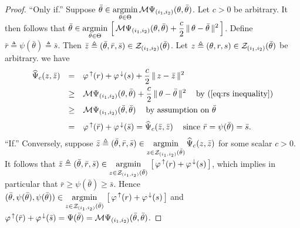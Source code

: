\documentclass{siamart}
\newcommand{\epc}{\hspace{1pc}}
\newcommand{\wh}{\widehat}
\begin{document}
\begin{proof}
 ``Only if.''  Suppose  $\bar{\theta} \in \displaystyle{
\operatornamewithlimits{\mbox{argmin}}_{\theta \in \Theta}
} \, {\cal M}\Psi_{(i_1, i_2)}(\theta,\bar{\theta})$.  Let $c > 0$ be arbitrary.  It then follows that
$\bar{\theta} \in \displaystyle{
\operatornamewithlimits{\mbox{argmin}}_{\theta \in \Theta}
} \, \left[ \, {\cal M}\Psi_{(i_1, i_2)}(\theta,\bar{\theta}) + \displaystyle{
\frac{c}{2}
} \, \| \, \theta - \bar{\theta} \, \|^2 \, \right]$.
Define
$\bar{r} \triangleq \psi(\bar{\theta}) \triangleq \bar{s}$.  Then $\bar{z} \triangleq ( \bar{\theta},\bar{r},\bar{s} ) \in {\cal Z}_{(i_1,i_2)}(\bar{\theta})$.
Let $z \triangleq ( \theta,r,s ) \in {\cal Z}_{(i_1,i_2)}(\bar{\theta})$ be arbitrary.   we have
 $$ \begin{array}{lll}
\wh{\Psi}_c%
(z,\bar{z}) & = &
\varphi^{\, \uparrow}(r) + \varphi^{\, \downarrow}(s) + \displaystyle{
\frac{c}{2}
} \, \| \, z - \bar{z} \, \|^2 \\[0.1in]
& \geq & {\cal M}\Psi_{(i_1,i_2)}(\theta,\bar{\theta}) + \displaystyle{
\frac{c}{2}
} \, \| \, \theta - \bar{\theta} \, \|^2 \epc \mbox{by (\ref{eq:rs inequality})} \\ [0.1in]
& \geq & {\cal M}\Psi_{(i_1,i_2)}(\bar{\theta},\bar{\theta}) \epc \mbox{by assumption on $\bar{\theta}$} \\ [0.1in]
& = & \varphi^{\, \uparrow}( \bar{r} ) + \varphi^{\, \downarrow}( \bar{s} )
 =  \wh{\Psi}_c%
 (\bar{z},\bar{z}) \epc \mbox{since $\bar{r} = \psi(\bar{\theta}) = \bar{s}$}.
\end{array}
$$
``If.''  Conversely, suppose $\bar{z} \triangleq ( \bar{\theta},\bar{r},\bar{s} ) \in \displaystyle{
\operatornamewithlimits{\mbox{argmin}}_{z \in {\cal Z}_{(i_1,i_2)}(\bar{\theta})}
} \, \wh{\Psi}_c%
(z,\bar{z})$ for some scalar $c > 0$.  It follows that
$\bar{z} \triangleq ( \bar{\theta},\bar{r},\bar{s} ) \in \displaystyle{
\operatornamewithlimits{\mbox{argmin}}_{z \in {\cal Z}_{(i_1,i_2)}(\bar{\theta})}
} \, \left[ \, \varphi^{\, \uparrow}(r) + \varphi^{\, \downarrow}(s) \, \right]$, which implies in particular that
$\bar{r} \geq \psi(\bar{\theta}) \geq \bar{s}$.  Hence
$( \bar{\theta},\psi(\bar{\theta}),\psi(\bar{\theta}) ) \in \displaystyle{
\operatornamewithlimits{\mbox{argmin}}_{z \in {\cal Z}_{(i_1,i_2)}(\bar{\theta})}
} \, \left[ \, \varphi^{\, \uparrow}(r) + \varphi^{\, \downarrow}(s) \, \right]$ and
$\varphi^{\, \uparrow}( \bar{r} ) + \varphi^{\, \downarrow}(\bar{s}) = \Psi(\bar{\theta}) = {\cal M}\Psi_{(i_1,i_2)}(\bar{\theta},\bar{\theta})$.

\end{proof}
\end{document}
